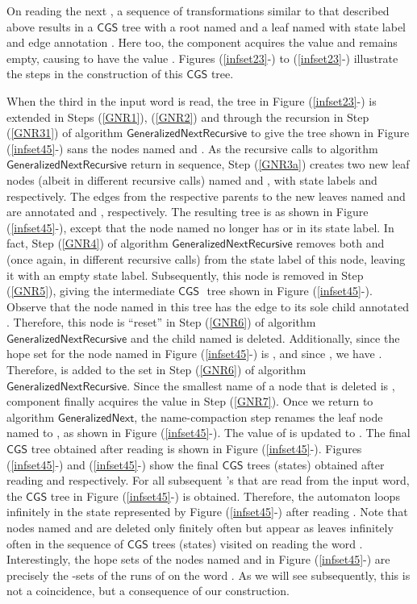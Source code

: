 \documentclass[3p]{elsarticle}
\newcommand{\CGS}{\ensuremath{\textsf{CGS }}}
\newcommand{\algo}[1]{\ensuremath{\textsf{{#1}}}}
\begin{document}
On reading the next , a sequence of transformations similar to that
described above results in a \CGS tree with a root named  and a
leaf named  with state label  and edge annotation .  Here
too, the component  acquires the value  and  remains empty,
causing  to have the value .  Figures (\ref{infset23}-) to
(\ref{infset23}-) illustrate the steps in the construction of
this \CGS tree.

When the third  in the input word is read, the tree in Figure
(\ref{infset23}-) is extended in Steps (\ref{GNR1}), (\ref{GNR2})
and through the recursion in Step (\ref{GNR31}) of algorithm
\algo{GeneralizedNextRecursive} to give the tree shown in Figure
(\ref{infset45}-) sans the nodes named  and .  As the
recursive calls to algorithm \algo{GeneralizedNextRecursive} return in
sequence, Step (\ref{GNR3a}) creates two new leaf nodes (albeit in
different recursive calls) named  and , with state labels
 and  respectively.  The edges from the respective
parents to the new leaves named  and  are annotated  and ,
respectively.  The resulting tree is as shown in Figure
(\ref{infset45}-), except that the node named  no longer has
 or  in its state label.  In fact, Step (\ref{GNR4}) of
algorithm \algo{GeneralizedNextRecursive} removes both  and 
(once again, in different recursive calls) from the state label of
this node, leaving it with an empty state label.  Subsequently, this
node is removed in Step (\ref{GNR5}), giving the intermediate \CGS
tree shown in Figure (\ref{infset45}-).  Observe that the node
named  in this tree has the edge to its sole child annotated .
Therefore, this node is ``reset'' in Step (\ref{GNR6}) of algorithm
\algo{GeneralizedNextRecursive} and the child named  is deleted.
Additionally, since the hope set for the node named  in Figure
(\ref{infset45}-) is , and since , we have
.  Therefore,  is added to the set  in
Step (\ref{GNR6}) of algorithm \algo{GeneralizedNextRecursive}.  Since
the smallest name of a node that is deleted is , component 
finally acquires the value  in Step (\ref{GNR7}).  Once we return
to algorithm \algo{GeneralizedNext}, the name-compaction step renames
the leaf node named  to , as shown in Figure
(\ref{infset45}-).  The value of  is updated to .  The final \CGS tree obtained after reading  is shown in
Figure (\ref{infset45}-).  Figures (\ref{infset45}-) and
(\ref{infset45}-) show the final \CGS trees (states) obtained after
reading  and  respectively.  For all subsequent 's
that are read from the input word, the \CGS tree in Figure
(\ref{infset45}-) is obtained.  Therefore, the automaton 
loops infinitely in the state represented by Figure
(\ref{infset45}-) after reading .  Note that nodes named 
and  are deleted only finitely often but appear as leaves
infinitely often in the sequence of \CGS trees (states) visited on
reading the word .  Interestingly, the hope sets of the
nodes named  and  in Figure (\ref{infset45}-) are precisely
the -sets of the runs of  on the word .  As
we will see subsequently, this is not a coincidence, but a consequence
of our construction.
\end{document}
